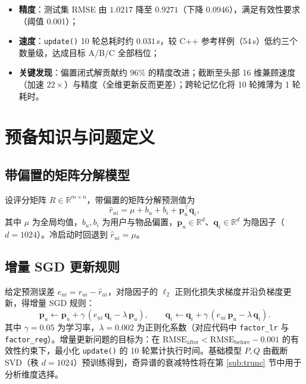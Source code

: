 \documentclass[UTF8,a4paper,10pt]{ctexart}
\newcommand{\xiaosi}{\fontsize{12pt}{20pt}\selectfont}
\newcommand{\nRmseBase}{1.0217}
\newcommand{\nRmseNew}{0.9271}
\newcommand{\nRmseDrop}{0.0946}
\newcommand{\nTimeTotalS}{0.031}     %
\newcommand{\nTruncSpeed}{22}        %
\newcommand{\nBiasPct}{96}           %
\begin{document}
\begin{tcolorbox}[colback=blue!3!white,colframe=blue!55!black,title=核心结论]
  \begin{itemize}[leftmargin=1.4em, itemsep=1pt, topsep=2pt]
    \item \textbf{精度}：测试集 RMSE 由 $\nRmseBase$ 降至 $\nRmseNew$（下降 $\nRmseDrop$），满足有效性要求（阈值 0.001）；
    \item \textbf{速度}：\texttt{update()} 10 轮总耗时约 $\nTimeTotalS$\,s，较 C++ 参考样例（54\,s）低约三个数量级，达成目标 A/B/C 全部档位；
    \item \textbf{关键发现}：偏置闭式解贡献约 $\nBiasPct\%$ 的精度改进；截断至头部 16 维兼顾速度（加速 $\nTruncSpeed\times$）与精度（全维更新反而更差）；跨轮记忆化将 10 轮摊薄为 1 轮耗时。
  \end{itemize}
\end{tcolorbox}

\section{预备知识与问题定义}
\xiaosi

\subsection{带偏置的矩阵分解模型}

设评分矩阵 $R\in\mathbb{R}^{m\times n}$，带偏置的矩阵分解预测值为
\begin{equation}
  \hat{r}_{ui} = \mu + b_u + b_i + \mathbf{p}_u^{\!\top}\mathbf{q}_i,
  \label{eq:pred}
\end{equation}
其中 $\mu$ 为全局均值，$b_u,b_i$ 为用户与物品偏置，$\mathbf{p}_u\in\mathbb{R}^d$、$\mathbf{q}_i\in\mathbb{R}^d$ 为隐因子（$d=1024$）。冷启动时回退到 $\hat r_{ui}=\mu$。

\subsection{增量 SGD 更新规则}

给定预测误差 $e_{ui}=r_{ui}-\hat r_{ui}$，对隐因子的 $\ell_2$ 正则化损失求梯度并沿负梯度更新，得增量 SGD 规则：
\begin{equation}
  \mathbf p_u \leftarrow \mathbf p_u + \gamma\,(e_{ui}\,\mathbf q_i - \lambda\,\mathbf p_u),\qquad
  \mathbf q_i \leftarrow \mathbf q_i + \gamma\,(e_{ui}\,\mathbf p_u - \lambda\,\mathbf q_i).
  \label{eq:sgd}
\end{equation}
其中 $\gamma{=}0.05$ 为学习率，$\lambda{=}0.002$ 为正则化系数（对应代码中 \texttt{factor\_lr} 与 \texttt{factor\_reg}）。增量更新问题的目标为：在 $\mathrm{RMSE}_{\text{after}} < \mathrm{RMSE}_{\text{before}} - 0.001$ 的有效性约束下，最小化 \texttt{update()} 的 10 轮累计执行时间。基础模型 $P,Q$ 由截断 SVD（秩 $d=1024$）预训练得到，奇异谱的衰减特性将在第 \ref{sub:trunc} 节中用于分析维度选择。
\end{document}

